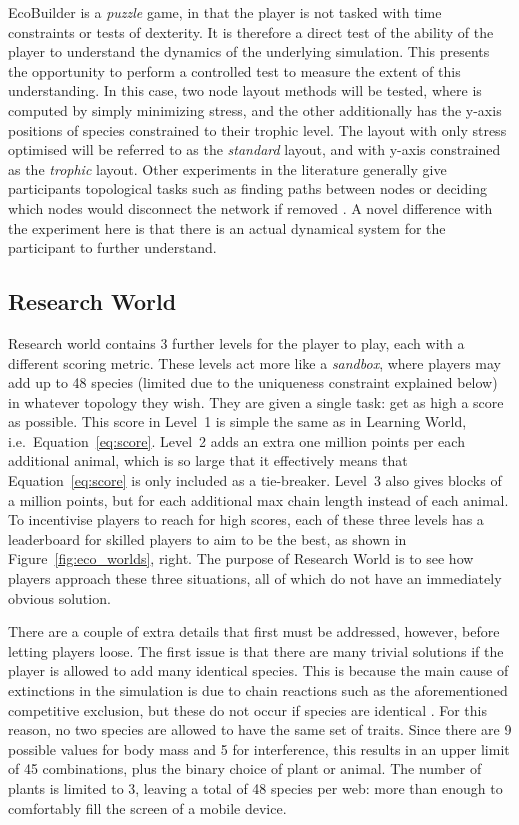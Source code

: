 EcoBuilder is a \emph{puzzle} game, in that the player is not tasked with time constraints or tests of dexterity. It is therefore a direct test of the ability of the player to understand the dynamics of the underlying simulation.
This presents the opportunity to perform a controlled test to measure the extent of this understanding. In this case, two node layout methods will be tested, where is computed by simply minimizing stress, and the other additionally has the y-axis positions of species constrained to their trophic level. The layout with only stress optimised will be referred to as the \emph{standard} layout, and with y-axis constrained as the \emph{trophic} layout.
Other experiments in the literature generally give participants topological tasks such as finding paths between nodes \citep{Bach2017, Okoe2018} or deciding which nodes would disconnect the network if removed \citep{Purchase1997}. A novel difference with the experiment here is that there is an actual dynamical system for the participant to further understand.

\subsection{Research World}
\label{sec:research_world}
Research world contains 3 further levels for the player to play, each with a different scoring metric. These levels act more like a \emph{sandbox}, where players may add up to 48 species (limited due to the uniqueness constraint explained below) in whatever topology they wish.
They are given a single task: get as high a score as possible. This score in Level~1 is simple the same as in Learning World, i.e.\ Equation~\ref{eq:score}. Level~2 adds an extra one million points per each additional animal, which is so large that it effectively means that Equation~\ref{eq:score} is only included as a tie-breaker. 
Level~3 also gives blocks of a million points, but for each additional max chain length instead of each animal.
To incentivise players to reach for high scores, each of these three levels has a leaderboard for skilled players to aim to be the best, as shown in Figure~\ref{fig:eco_worlds}, right.
The purpose of Research World is to see how players approach these three situations, all of which do not have an immediately obvious solution.

There are a couple of extra details that first must be addressed, however, before letting players loose. The first issue is that there are many trivial solutions if the player is allowed to add many identical species. This is because the main cause of extinctions in the simulation is due to chain reactions such as the aforementioned competitive exclusion, but these do not occur if species are identical \citep{Armstrong1980}. For this reason, no two species are allowed to have the same set of traits. Since there are 9 possible values for body mass and 5 for interference, this results in an upper limit of 45 combinations, plus the binary choice of plant or animal. The number of plants is limited to 3, leaving a total of 48 species per web: more than enough to comfortably fill the screen of a mobile device.

